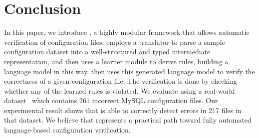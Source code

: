 
\section{Conclusion}

In this paper, we introduce \app, a highly modular framework 
that allows automatic verification of configuration files.
\app employs a translator to parse a sample configuration dataset
into a well-structured and typed intermediate representation,
and then uses a learner module to derive rules, 
building a language model in this way.
\app then uses this generated language model 
to verify the correctness of
a given configuration file. The verification is done by
checking whether any of the learned rules is violated.
We evaluate \app using a real-world dataset~\cite{configdataset}
which contains 261 incorrect MySQL configuration files.
Our experimental result shows that \app is able to
correctly detect errors in 217 files in that dataset.
 We believe that \app represents a practical path
toward fully automated language-based configuration verification.

